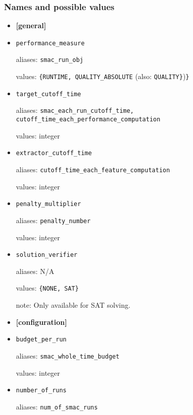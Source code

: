 \documentclass{article}
\begin{document}
\subsubsection{Names and possible values}
\label{sect:settings_details}
\begin{itemize}[noitemsep]
  \item[] \textbf{[general]}\\
  \item[] \texttt{performance\_measure}

          aliases: \texttt{smac\_run\_obj}

          values: \texttt{\{RUNTIME, QUALITY\_ABSOLUTE} (also: \texttt{QUALITY\}})\texttt{\}}\\
  \item[] \texttt{target\_cutoff\_time}

          aliases: \texttt{smac\_each\_run\_cutoff\_time, cutoff\_time\_each\_performance\_computation}

          values: integer\\
  \item[] \texttt{extractor\_cutoff\_time}

          aliases: \texttt{cutoff\_time\_each\_feature\_computation}

          values: integer\\
  \item[] \texttt{penalty\_multiplier}

          aliases: \texttt{penalty\_number}

          values: integer\\
  \item[] \texttt{solution\_verifier}

          aliases: N/A

          values: \texttt{\{NONE, SAT\}}

          note: Only available for SAT solving.\\
  \item[] \textbf{[configuration]}\\
  \item[] \texttt{budget\_per\_run}

          aliases: \texttt{smac\_whole\_time\_budget}

          values: integer\\
  \item[] \texttt{number\_of\_runs}

          aliases: \texttt{num\_of\_smac\_runs}


\end{itemize}
\end{document}
